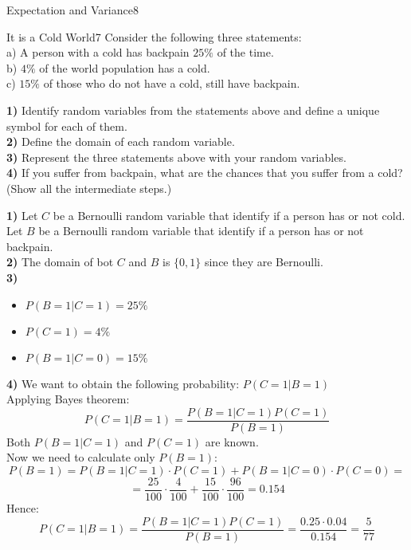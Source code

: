 \begin{questions}
\begin{question}{Expectation and Variance}{8}
\end{question}


\begin{question}{It is a Cold World}{7}
Consider the following three statements:
\\
a) A person with a cold has backpain $25\%$ of the time.
\\
b) $4\%$ of the world population has a cold.
\\
c) $15\%$ of those who do not have a cold, still have backpain.

\textbf{1)} Identify random variables from the statements above and define a unique symbol for each of them.\\
\textbf{2)} Define the domain of each random variable.\\
\textbf{3)} Represent the three statements above with your random variables.\\
\textbf{4)} If you suffer from backpain, what are the chances that you suffer from a cold? (Show all the intermediate steps.)

\begin{answer}
	\textbf{1)} Let $C$ be a Bernoulli random variable that identify if a person has or not cold. \\
	Let $B$ be a Bernoulli random variable that identify if a person has or not backpain. \\
	\textbf{2)} The domain of bot $C$ and $B$ is $\{0, 1\}$ since they are Bernoulli.\\
	\textbf{3)} 
	\begin{itemize}
	\item [a)] $ P( B=1 | C=1 ) = 25\% $
	\item [b)] $ P( C=1 ) = 4\% $
	\item [c)] $ P( B=1 | C=0 ) = 15\% $
\end{itemize}
	\textbf{4)} We want to obtain the following probability: $ P( C=1 | B=1 ) $ \\
	Applying Bayes theorem:
	$$
	P( C=1 | B=1 ) = \frac{P( B=1 | C=1 ) P( C=1 )}{P( B=1 )}
	$$
	Both $ P( B=1 | C=1 ) $ and $ P( C=1 ) $ are known. \\
	Now we need to calculate only $P(B=1)$:
	$$
	P(B=1) = P( B=1 | C=1 ) \cdot P( C=1 ) + P( B=1 | C=0 ) \cdot P( C=0 ) =
	$$
	$$
	= \frac{25}{100} \cdot \frac{4}{100} + \frac{15}{100} \cdot \frac{96}{100} = 0.154
	$$
	Hence:
	$$
	P( C=1 | B=1 ) = \frac{P( B=1 | C=1 ) P( C=1 )}{P( B=1 )} = \frac{0.25 \cdot 0.04}{0.154} = \frac{5}{77}
	$$
\end{answer}


\end{question}
\end{questions}
